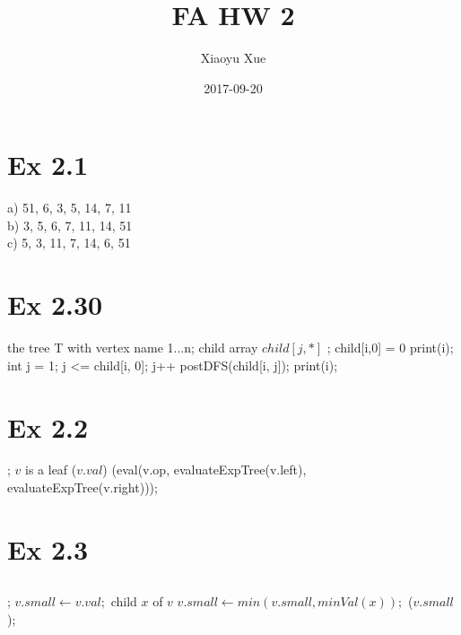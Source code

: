 

\title{FA HW 2}
\date{2017-09-20}
\author{Xiaoyu Xue}

\renewcommand{\thesubsection}{\thesection.\alph{subsection}}
\renewcommand{\thesection}{\arabic{section}}


\maketitle

\section{Ex 2.1}
a) 51, 6, 3, 5, 14, 7, 11\\
b) 3, 5, 6, 7, 11, 14, 51\\
c) 5, 3, 11, 7, 14, 6, 51\\

\section{Ex 2.30}
\Prog\qq     %
\Global the tree T with vertex name 1...n; child array $child[j,*]$\qq
{}; \qq 
\If child[i,0] = 0 \Then\qq
 print(i);\qq
\Else\qq
\Foreach int j = 1; j <= child[i, 0]; j++ \Do\qq
postDFS(child[i, j]);\qq
print(i);\qq
\Endfor\qq
\Endif\qq
\Fini 

\section{Ex 2.2}
\Prog\qq     %
; \p
\If $v$ is a leaf \Then\p
 \Return($v.val$)\p
\Else\p
\Return(eval(v.op, evaluateExpTree(v.left), evaluateExpTree(v.right))); \p
\Endif\qq
\Fini 

\section{Ex 2.3}

\subsection{}
\Prog\qq  
{}; \p
$v.small \leftarrow v.val;$\p
\Foreach child $x$ of $v$ \Do\p
$v.small \leftarrow min(v.small, minVal(x));$\p
\Endfor\p
\Return($v.small$);\qq
\Fini 

